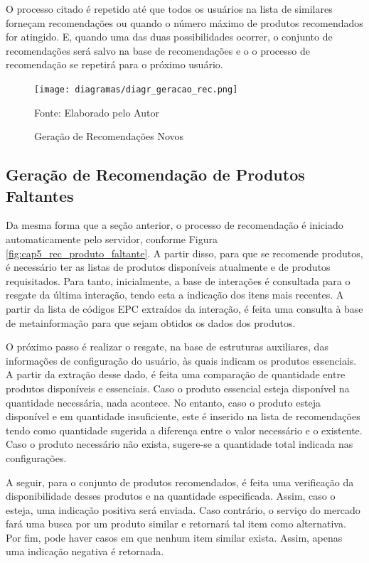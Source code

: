 O processo citado é repetido até que todos os usuários na lista de similares forneçam recomendações ou quando o número máximo de produtos recomendados for atingido. E, quando uma das duas possibilidades ocorrer, o conjunto de recomendações será salvo na base de recomendações e o o processo de recomendação se repetirá para o próximo usuário.

\begin{figure}[H]
    \caption{Geração de Recomendações Novos} 
    \label{fig:cap5_diagr_geracao_rec}
    \texttt{[image: diagramas/diagr\_geracao\_rec.png]}
    
    \footnotesize{Fonte: Elaborado pelo Autor}
\end{figure}

\subsection{Geração de Recomendação de Produtos Faltantes}

Da mesma forma que a seção anterior, o processo de recomendação é iniciado automaticamente pelo servidor, conforme Figura \ref{fig:cap5_rec_produto_faltante}. A partir disso, para que se recomende produtos, é necessário ter as listas de produtos disponíveis atualmente e de produtos requisitados. Para tanto, inicialmente, a base de interações é consultada para o resgate da última interação, tendo esta a indicação dos itens mais recentes. A partir da lista de códigos EPC extraídos da interação, é feita uma consulta à base de metainformação para que sejam obtidos os dados dos produtos.

O próximo passo é realizar o resgate, na base de estruturas auxiliares, das informações de configuração do usuário, às quais indicam os produtos essenciais. A partir da extração desse dado, é feita uma comparação de quantidade entre produtos disponíveis e essenciais. Caso o produto essencial esteja disponível na quantidade necessária, nada acontece. No entanto, caso o produto esteja disponível e em quantidade insuficiente, este é inserido na lista de recomendações tendo como quantidade sugerida a diferença entre o valor necessário e o existente. Caso o produto necessário não exista, sugere-se a quantidade total indicada nas configurações.

A seguir, para o conjunto de produtos recomendados, é feita uma verificação da disponibilidade desses produtos e na quantidade especificada. Assim, caso o esteja, uma indicação positiva será enviada. Caso contrário, o serviço do mercado fará uma busca por um produto similar e retornará tal item como alternativa. Por fim, pode haver casos em que nenhum item similar exista. Assim, apenas uma indicação negativa é retornada.

